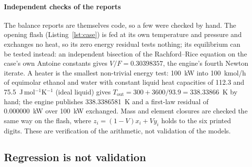 \documentclass[preprint,12pt]{elsarticle}
\begin{document}
\paragraph{Independent checks of the reports}  The balance reports are
themselves code, so a few were checked by hand.  The opening flash
(Listing~\ref{lst:case}) is fed at its own temperature and pressure and
exchanges no heat, so its zero energy residual tests nothing; its
equilibrium can be tested instead: an independent bisection of the
Rachford--Rice equation on the case's own Antoine constants gives
$V/F = 0.30398357$, the engine's fourth Newton iterate.  A heater is the
smallest non-trivial energy test: 100~kW into 100~kmol/h of equimolar
ethanol and water with constant liquid heat capacities of 112.3 and
75.5~J\,mol$^{-1}$K$^{-1}$ (ideal liquid) gives
$T_\text{out} = 300 + 3600/93.9 = 338.33866$~K by hand; the engine
publishes 338.3386581~K and a first-law residual of 0.000000~kW over
100~kW exchanged.  Mass and element closures are checked the same way on
the flash, where $z_i = (1-V)x_i + V y_i$ holds to the six printed digits.
These are verification of the arithmetic, not validation of the models.

\subsection{Regression is not validation}
\label{sec:vv-golden}
\end{document}
